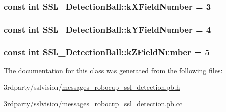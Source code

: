\hypertarget{class_s_s_l___detection_ball_a72a5d2a5623ffe1d875b7557165891b7}{
\subsubsection[{k\-X\-Field\-Number}]{\setlength{\rightskip}{0pt plus 5cm}const int S\-S\-L\-\_\-\-Detection\-Ball\-::k\-X\-Field\-Number = 3\hspace{0.3cm}{\ttfamily [static]}}}\label{class_s_s_l___detection_ball_a72a5d2a5623ffe1d875b7557165891b7}
\hypertarget{class_s_s_l___detection_ball_a1807e55eb02410fcb4da6fcdfbc7f649}{
\subsubsection[{k\-Y\-Field\-Number}]{\setlength{\rightskip}{0pt plus 5cm}const int S\-S\-L\-\_\-\-Detection\-Ball\-::k\-Y\-Field\-Number = 4\hspace{0.3cm}{\ttfamily [static]}}}\label{class_s_s_l___detection_ball_a1807e55eb02410fcb4da6fcdfbc7f649}
\hypertarget{class_s_s_l___detection_ball_a8a8f8051324f8b78f966c189359c1a40}{
\subsubsection[{k\-Z\-Field\-Number}]{\setlength{\rightskip}{0pt plus 5cm}const int S\-S\-L\-\_\-\-Detection\-Ball\-::k\-Z\-Field\-Number = 5\hspace{0.3cm}{\ttfamily [static]}}}\label{class_s_s_l___detection_ball_a8a8f8051324f8b78f966c189359c1a40}


The documentation for this class was generated from the following files\-:\begin{DoxyCompactItemize}
\item 
3rdparty/sslvision/\hyperlink{messages__robocup__ssl__detection_8pb_8h}{messages\-\_\-robocup\-\_\-ssl\-\_\-detection.\-pb.\-h}\item 
3rdparty/sslvision/\hyperlink{messages__robocup__ssl__detection_8pb_8cc}{messages\-\_\-robocup\-\_\-ssl\-\_\-detection.\-pb.\-cc}\end{DoxyCompactItemize}
